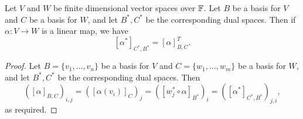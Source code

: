 \documentclass[a4paper]{scrartcl}
\begin{document}
\begin{theorem}
    Let $V$ and $W$ be finite dimensional vector spaces over $\mathbb{F}$. Let $B$ be a basis for $V$ and $C$ be a basis for $W$, and let $B^*, C^*$ be the corresponding dual spaces.
    Then if $\alpha: V \rightarrow W$ is a linear map, we have
    $$
    [\alpha^*]_{C^*, B^*} = [\alpha]_{B, C}^T.
    $$
\end{theorem}
\begin{proof}
    Let $B = \{v_1, \dots, v_n\}$ be a basis for $V$ and $C = \{w_1, \dots, w_m\}$ be a basis for $W$, and let $B^*, C^*$ be the corresponding dual spaces. Then 
    $$
    ([\alpha]_{B, C})_{i, j} = ([\alpha(v_i)]_{C})_j = ([w_j^* \circ \alpha]_{B^*})_i = ([\alpha^*]_{C^*, B^*})_{j, i},
    $$
    as required.
\end{proof}
\end{document}
